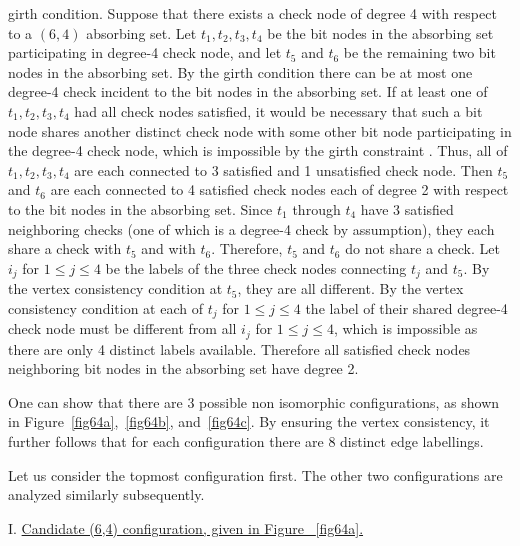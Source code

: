 girth condition. Suppose that there exists a check node of degree
4 with respect to a $(6,4)$ absorbing set. Let $t_1, t_2,t_3,t_4$
be the bit nodes in the absorbing set participating in degree-4
check node, and let $t_5$ and $t_6$ be the remaining two bit nodes
in the absorbing set. By the girth condition there can be at most
one degree-4 check incident to the bit nodes in the absorbing set.
If at least one of $t_1, t_2,t_3,t_4$ had all check nodes
satisfied, it would be necessary that such a bit node shares
another distinct check node with some other bit node participating
in the degree-4 check node, which is impossible by the girth
constraint \cite{fan}. Thus, all of $t_1, t_2,t_3,t_4$ are each
connected to 3 satisfied and 1 unsatisfied check node. Then $t_5$
and $t_6$ are each connected to 4 satisfied check nodes each of
degree 2 with respect to the bit nodes in the absorbing set. Since
$t_1$ through $t_4$ have 3 satisfied neighboring checks (one of
which is a degree-4 check by assumption), they each share a check
with $t_5$ and with $t_6$. Therefore, $t_5$ and $t_6$ do not share
a check. Let $i_j$ for $1 \leq j \leq 4$ be the labels of the
three check nodes connecting $t_j$ and $t_5$. By the vertex
consistency condition at $t_5$, they are all different. By the
vertex consistency condition at each of $t_j$ for $1 \leq j \leq
4$ the label of their shared degree-4 check node must be different
from all $i_j$ for $1 \leq j \leq 4$, which is impossible as there
are only 4 distinct labels available. Therefore all satisfied
check nodes neighboring bit nodes in the absorbing set have degree
2.



One can show that there are 3 possible non isomorphic
configurations, as shown in Figure~\ref{fig64a},~\ref{fig64b},
and~\ref{fig64c}. By ensuring the vertex consistency, it further
follows that for each configuration there are 8 distinct edge
labellings.

Let us consider the topmost configuration first. The other two
configurations are analyzed similarly subsequently.

I. \underline{Candidate (6,4) configuration, given in Figure
~\ref{fig64a}.}

